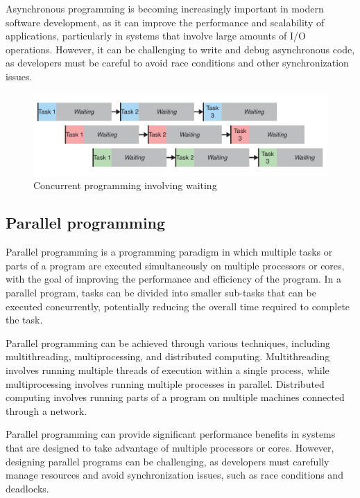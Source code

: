Asynchronous programming is becoming increasingly important in modern software development, as it can improve the performance and scalability of applications, particularly in systems that involve large amounts of I/O operations.
However, it can be challenging to write and debug asynchronous code, as developers must be careful to avoid race conditions and other synchronization issues.
\begin{figure}[H]
    \centering
    \includegraphics[width=\textwidth]{figures/concurrency/concurrent.pdf}
    \caption{Concurrent programming involving waiting}
    \label{fig:concurrency_concurrent}
\end{figure}

\subsection{Parallel programming}

Parallel programming is a programming paradigm in which multiple tasks or parts of a program are executed simultaneously on multiple processors or cores, with the goal of improving the performance and efficiency of the program.
In a parallel program, tasks can be divided into smaller sub-tasks that can be executed concurrently, potentially reducing the overall time required to complete the task.

Parallel programming can be achieved through various techniques, including multithreading, multiprocessing, and distributed computing.
Multithreading involves running multiple threads of execution within a single process, while multiprocessing involves running multiple processes in parallel.
Distributed computing involves running parts of a program on multiple machines connected through a network.

Parallel programming can provide significant performance benefits in systems that are designed to take advantage of multiple processors or cores.
However, designing parallel programs can be challenging, as developers must carefully manage resources and avoid synchronization issues, such as race conditions and deadlocks.

